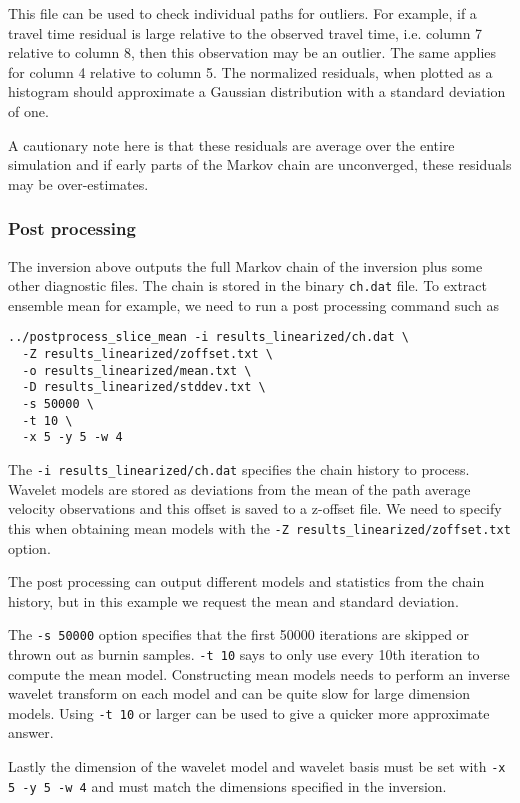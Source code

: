\documentclass[a4paper,12pt]{article}
\begin{document}
This file can be used to check individual paths for outliers. For example, if a travel time residual
is large relative to the observed travel time, i.e. column 7 relative to column 8, then this observation
may be an outlier. The same applies for column 4 relative to column 5. The normalized residuals, when
plotted as a histogram should approximate a Gaussian distribution with a standard deviation of one.

A cautionary note here is that these residuals are average over the entire simulation
and if early parts of the Markov chain are unconverged, these residuals may be over-estimates.

\subsubsection{Post processing}

The inversion above outputs the full Markov chain of the inversion plus
some other diagnostic files. The chain is stored in the binary
{\tt ch.dat} file. To extract ensemble mean for example, we need
to run a post processing command such as 


\begin{verbatim}
../postprocess_slice_mean -i results_linearized/ch.dat \
  -Z results_linearized/zoffset.txt \
  -o results_linearized/mean.txt \
  -D results_linearized/stddev.txt \
  -s 50000 \
  -t 10 \
  -x 5 -y 5 -w 4
\end{verbatim}

The {\tt -i results\_linearized/ch.dat} specifies the chain history
to process. Wavelet models are stored as deviations from the mean
of the path average velocity observations and this offset is saved
to a z-offset file. We need to specify this when obtaining
mean models with the {\tt -Z results\_linearized/zoffset.txt} option.

The post processing can output different models and statistics from
the chain history, but in this example we request the mean
and standard deviation.

The {\tt -s 50000} option specifies that the first 50000 iterations are
skipped or thrown out as burnin samples. {\tt -t 10} says to only
use every 10th iteration to compute the mean model. Constructing mean
models needs to perform an inverse wavelet transform on each
model and can be quite slow for large dimension models. Using {\tt -t 10}
or larger can be used to give a quicker more approximate answer.

Lastly the dimension of the wavelet model and wavelet basis must be
set with {\tt -x 5 -y 5 -w 4} and must match the dimensions specified
in the inversion.
\end{document}
